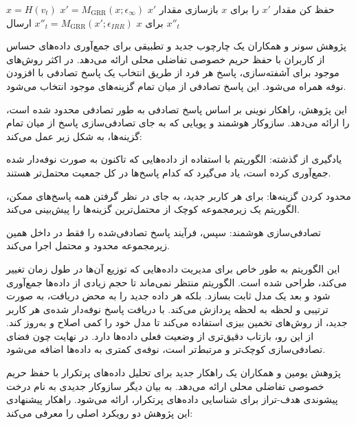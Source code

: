      $x = H(v_t)$
         $x' = M_{\text{GRR}}(x; \epsilon_\infty)$ 
         حفظ کن مقدار $x'$ را برای $x$
    \Else
         بازسازی مقدار $x'$ برای $x$
    \EndIf
     $x''_t = M_{\text{GRR}}(x'; \epsilon_{IRR})$ 
     ارسال $x''_t$ 
\EndFor




پژوهش سونر و همکاران  یک چارچوب جدید و تطبیقی برای جمع‌آوری داده‌های حساس از کاربران با حفظ حریم خصوصی تفاضلی محلی ارائه می‌دهد. در اکثر روش‌های موجود برای آشفته‌سازی، پاسخ هر فرد از طریق انتخاب یک پاسخ تصادفی با افزودن نوفه همراه می‌شود. این پاسخ تصادفی از میان تمام گزینه‌های موجود انتخاب می‌شود.

این پژوهش، راهکار نوینی بر اساس پاسخ تصادفی به طور تصادفی محدود شده است، را ارائه می‌دهد.  سازوکار هوشمند و پویایی که به جای تصادفی‌سازی پاسخ از میان تمام گزینه‌ها، به شکل زیر عمل می‌کند:


 یادگیری از گذشته: الگوریتم با استفاده از داده‌هایی که تاکنون به صورت نوفه‌دار شده جمع‌آوری کرده است، یاد می‌گیرد که کدام پاسخ‌ها در کل جمعیت محتمل‌تر هستند.

 محدود کردن گزینه‌ها: برای هر کاربر جدید، به جای در نظر گرفتن همه پاسخ‌های ممکن، الگوریتم یک زیرمجموعه کوچک از محتمل‌ترین گزینه‌ها را پیش‌بینی می‌کند.

 تصادفی‌سازی هوشمند: سپس، فرآیند پاسخ تصادفی‌شده را فقط در داخل همین زیرمجموعه محدود و محتمل اجرا می‌کند.


این الگوریتم به طور خاص برای مدیریت داده‌هایی که توزیع آن‌ها در طول زمان تغییر می‌کند، طراحی شده است. الگوریتم منتظر نمی‌ماند تا حجم زیادی از داده‌ها جمع‌آوری شود و بعد یک مدل ثابت بسازد. بلکه هر داده جدید را به محض دریافت، به صورت ترتیبی و لحظه به لحظه پردازش می‌کند. با دریافت پاسخ نوفه‌دار شده‌ی هر کاربر جدید، از روش‌های تخمین بیزی استفاده می‌کند تا مدل خود را کمی اصلاح و به‌روز کند. از این رو، بازتاب دقیق‌تری از وضعیت فعلی داده‌ها دارد. در نهایت چون فضای تصادفی‌سازی کوچک‌تر و مرتبط‌تر است، نوفه‌ی کمتری به داده‌ها اضافه می‌شود.


پژوهش یومین و همکاران  یک راهکار جدید برای تحلیل داده‌های پرتکرار با حفظ حریم خصوصی تفاضلی محلی ارائه می‌دهد. به بیان دیگر سازوکار جدیدی به نام درخت پیشوندی هدف-تراز برای شناسایی داده‌های پرتکرار، ارائه می‌شود. راهکار پیشنهادی این پژوهش دو رویکرد اصلی را معرفی می‌کند:

